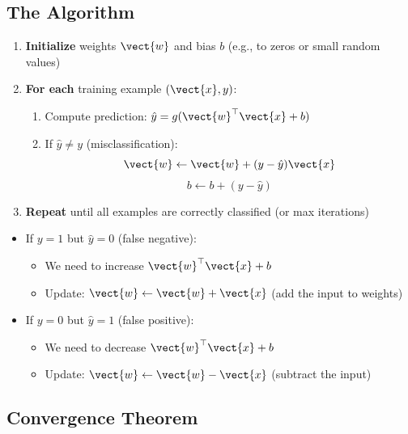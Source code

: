 \subsection{The Algorithm}

\begin{enumerate}
    \item \textbf{Initialize} weights $\vect{w}$ and bias $b$ (e.g., to zeros or small random values)
    \item \textbf{For each} training example $(\vect{x}, y)$:
    \begin{enumerate}
        \item Compute prediction: $\hat{y} = g(\vect{w}^\top \vect{x} + b)$
        \item If $\hat{y} \neq y$ (misclassification):
        \[
        \vect{w} \leftarrow \vect{w} + (y - \hat{y}) \vect{x}
        \]
        \[
        b \leftarrow b + (y - \hat{y})
        \]
    \end{enumerate}
    \item \textbf{Repeat} until all examples are correctly classified (or max iterations)
\end{enumerate}

\begin{bluebox}
\begin{itemize}
    \item If $y = 1$ but $\hat{y} = 0$ (false negative):
    \begin{itemize}
        \item We need to increase $\vect{w}^\top \vect{x} + b$
        \item Update: $\vect{w} \leftarrow \vect{w} + \vect{x}$ (add the input to weights)
    \end{itemize}
    \item If $y = 0$ but $\hat{y} = 1$ (false positive):
    \begin{itemize}
        \item We need to decrease $\vect{w}^\top \vect{x} + b$
        \item Update: $\vect{w} \leftarrow \vect{w} - \vect{x}$ (subtract the input)
    \end{itemize}
\end{itemize}
\end{bluebox}

\subsection{Convergence Theorem}

